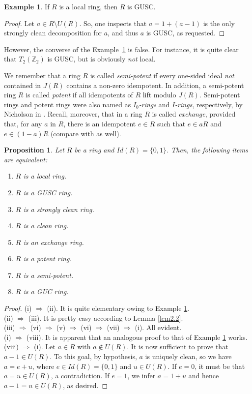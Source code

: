 \documentclass[12pt]{amsart}
\newtheorem{proposition}[theorem]{Proposition}
\theoremstyle{definition}
\newtheorem{example}[theorem]{Example}
\begin{document}
\begin{example}\label{exam2.7}
If $R$ is a local ring, then $R$ is GUSC.
\end{example}

\begin{proof}
Let $a \in R\setminus U(R)$. So, one inspects that $a=1+(a-1)$ is the only strongly clean decomposition for $a$, and thus $a$ is GUSC, as requested.
\end{proof}

However, the converse of the Example~\ref{exam2.7} is false. For instance, it is quite clear that $T_{2}(\mathbb{Z}_{2})$ is GUSC, but is obviously {\it not} local.

\medskip

We remember that a ring $R$ is called {\it semi-potent} if every one-sided ideal {\it not} contained in $J(R)$ contains a non-zero idempotent. In addition, a semi-potent ring $R$ is called {\it potent} if all idempotents of $R$ lift modulo $J(R)$. Semi-potent rings and potent rings were also named as {\it $I_{0}$-rings} and {\it $I$-rings}, respectively, by Nicholson in \cite{11}. Recall, moreover, that in \cite{55} a ring $R$ is called {\it exchange}, provided that, for any $a$ in $R$, there is an idempotent $e\in R$ such that $e\in aR$ and $e\in (1-a)R$ (compare with \cite{3} as well).

\begin{proposition}\label{prop2.8}
Let $R$ be a ring and $Id(R)=\{0,1\}$. Then, the following items are equivalent:
\begin{enumerate}
\item
$R$ is a local ring.
\item
$R$ is a GUSC ring.
\item
$R$ is a strongly clean ring.
\item
$R$ is a clean ring.
\item
$R$ is an exchange ring.
\item
$R$ is a potent ring.
\item
$R$ is a semi-potent.
\item
$R$ is a GUC ring.
\end{enumerate}
\end{proposition}

\begin{proof}
(i) $\Rightarrow$ (ii). It is quite elementary owing to Example \ref{exam2.7}.\\
(ii) $\Rightarrow$ (iii). It is pretty easy according to Lemma \ref{lem2.2}.\\
(iii) $\Rightarrow$ (vi) $\Rightarrow$ (v) $\Rightarrow$ (vi) $\Rightarrow$ (vii) $\Rightarrow$ (i). All evident.\\
(i) $\Rightarrow$ (viii). It is apparent that an analogous proof to that of Example \ref{exam2.7} works.\\
(viii) $\Rightarrow$ (i). Let $a\in R$ with $a\not\in U(R)$. It is now sufficient to prove that $a-1\in U(R)$. To this goal, by hypothesis, $a$ is uniquely clean, so we have $a=e+u$, where $e\in {Id}(R)=\{0,1\}$ and $u\in U(R)$. If $e=0$, it must be that $a=u\in U(R)$, a contradiction. If $e=1$, we infer $a=1+u$ and hence $a-1=u\in U(R)$, as desired.
\end{proof}
\end{document}
